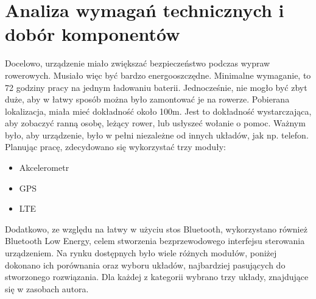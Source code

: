 \section{Analiza wymagań technicznych i dobór komponentów}
\label{sec:technical_analysis}
Docelowo, urządzenie miało zwiększać bezpieczeństwo podczas wypraw rowerowych. Musiało więc być bardzo energooszczędne. Minimalne wymaganie, to 72 godziny pracy na jednym ładowaniu baterii. Jednocześnie, nie mogło być zbyt duże, aby w łatwy sposób można było zamontować je na rowerze. Pobierana lokalizacja, miała mieć dokładność około 100m. Jest to dokładność wystarczająca, aby zobaczyć ranną osobę, leżący rower, lub usłyszeć wołanie o pomoc. Ważnym było, aby urządzenie, było w pełni niezależne od innych układów, jak np. telefon.
\newline
Planując pracę, zdecydowano się wykorzystać trzy moduły:
\begin{itemize}
    \item Akcelerometr
    \item GPS
    \item LTE
\end{itemize}
Dodatkowo, ze względu na łatwy w użyciu stos Bluetooth, wykorzystano również Bluetooth Low Energy, celem stworzenia bezprzewodowego interfejsu sterowania urządzeniem.
\newline
Na rynku dostępnych było wiele różnych modułów, poniżej dokonano ich porównania oraz wyboru układów, najbardziej pasujących do stworzonego rozwiązania. Dla każdej z kategorii wybrano trzy układy, znajdujące się w zasobach autora.

